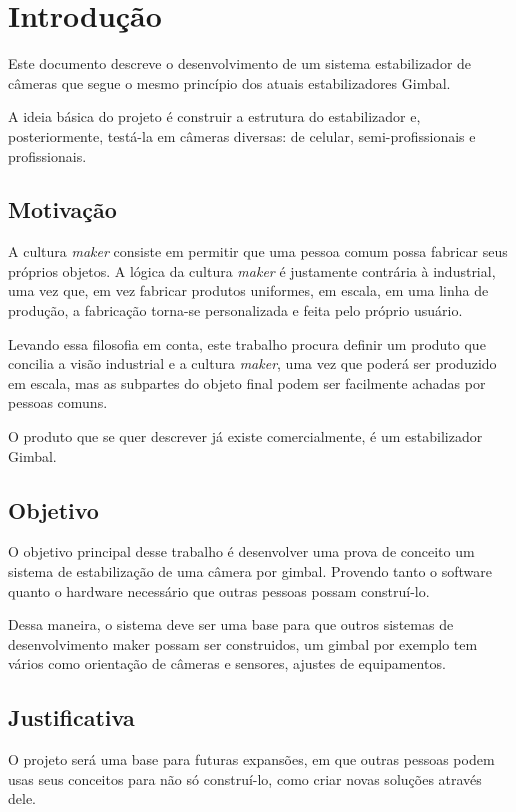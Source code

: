 \chapter{Introdução}\label{CAP:introducao}

Este documento descreve o desenvolvimento de um sistema estabilizador de câmeras que segue o mesmo princípio dos atuais estabilizadores Gimbal.

A ideia básica do projeto é construir a estrutura do estabilizador e, posteriormente, testá-la em câmeras diversas: de celular, semi-profissionais e profissionais.

\section{Motivação}
A cultura \textit{maker} consiste em permitir que uma pessoa comum possa fabricar seus próprios objetos. A lógica da cultura \textit{maker} é justamente contrária à industrial, uma vez que, em vez fabricar produtos uniformes, em escala, em uma linha de produção, a fabricação torna-se personalizada e feita pelo próprio usuário\cite{cultura_maker}.

Levando essa filosofia em conta, este trabalho procura definir um produto que concilia a visão industrial e a cultura \textit{maker}, uma vez que poderá ser produzido em escala, mas as subpartes do objeto final podem ser facilmente achadas por pessoas comuns.

O produto que se quer descrever já existe comercialmente, é um estabilizador Gimbal.
 
\section{Objetivo}

O objetivo principal desse trabalho é desenvolver uma prova de conceito um sistema de estabilização de uma câmera por gimbal. Provendo tanto o software quanto o hardware necessário que outras pessoas possam construí-lo.

Dessa maneira, o sistema deve ser uma base para que outros sistemas de desenvolvimento maker possam ser construidos, um gimbal por exemplo tem vários como orientação de câmeras e sensores, ajustes de equipamentos.


\section{Justificativa}

O projeto será uma base para futuras expansões, em que outras pessoas podem usas seus conceitos para não só construí-lo, como criar novas soluções através dele. 

